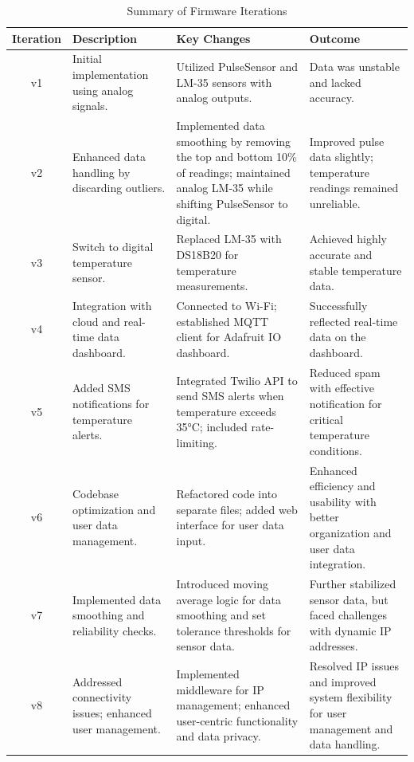 \begin{table}[h!]
\centering
\caption{Summary of Firmware Iterations}
\label{tab:firmware_iterations}
\begin{tabularx}{\textwidth}{|c|X|X|X|}
\hline
\textbf{Iteration} & \textbf{Description} & \textbf{Key Changes} & \textbf{Outcome} \\ \hline
v1 & Initial implementation using analog signals. & Utilized PulseSensor and LM-35 sensors with analog outputs. & Data was unstable and lacked accuracy. \\ \hline
v2 & Enhanced data handling by discarding outliers. & Implemented data smoothing by removing the top and bottom 10\% of readings; maintained analog LM-35 while shifting PulseSensor to digital. & Improved pulse data slightly; temperature readings remained unreliable. \\ \hline
v3 & Switch to digital temperature sensor. & Replaced LM-35 with DS18B20 for temperature measurements. & Achieved highly accurate and stable temperature data. \\ \hline
v4 & Integration with cloud and real-time data dashboard. & Connected to Wi-Fi; established MQTT client for Adafruit IO dashboard. & Successfully reflected real-time data on the dashboard. \\ \hline
v5 & Added SMS notifications for temperature alerts. & Integrated Twilio API to send SMS alerts when temperature exceeds 35°C; included rate-limiting. & Reduced spam with effective notification for critical temperature conditions. \\ \hline
v6 & Codebase optimization and user data management. & Refactored code into separate files; added web interface for user data input. & Enhanced efficiency and usability with better organization and user data integration. \\ \hline
v7 & Implemented data smoothing and reliability checks. & Introduced moving average logic for data smoothing and set tolerance thresholds for sensor data. & Further stabilized sensor data, but faced challenges with dynamic IP addresses. \\ \hline
v8 & Addressed connectivity issues; enhanced user management. & Implemented middleware for IP management; enhanced user-centric functionality and data privacy. & Resolved IP issues and improved system flexibility for user management and data handling. \\ \hline
\end{tabularx}
\end{table}



